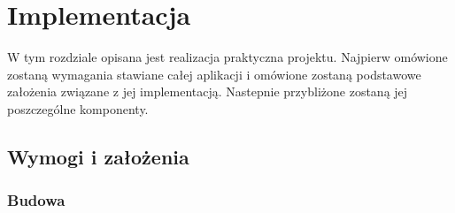 \chapter{Implementacja}
\label{cha:implementacja}

W tym rozdziale opisana jest realizacja praktyczna projektu. Najpierw omówione zostaną wymagania stawiane całej aplikacji i omówione zostaną podstawowe
założenia związane z jej implementacją. Nastepnie przybliżone zostaną jej poszczególne komponenty.

\section{Wymogi i założenia}
\label{sec:wymogi}

\subsection{Budowa}
\label{subs:budowaAplikacji}

